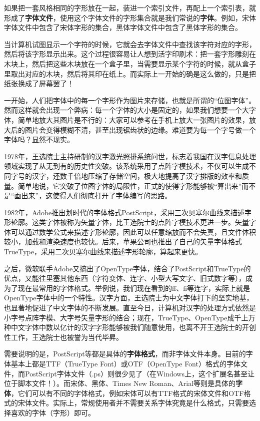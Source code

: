 如果把一套风格相同的字形放在一起，装进一个索引文件，再配上一个索引表，就形成了\textbf{字体文件}，使用这个字体文件的字形集合就是我们常说的\textbf{字体}。例如，宋体字体文件中包含了宋体字形的集合，黑体字体文件中包含了黑体字形的集合。

当计算机试图显示一个字符的时候，它就会去字体文件中查找该字符对应的字形，然后将该字形显示出来。这个过程很容易让人想到活字印刷术：把一套字形雕刻在木块上，然后把这些木块放在一个盒子里，当需要显示某个字符的时候，就从盒子里取出对应的木块，然后将其印在纸上。而实际上一开始的确是这么做的，只是把纸张换成了屏幕罢了！

一开始，人们把字体中的每一个字形作为图片来存储，也就是所谓的“位图字体”。然而这样就会出现一个弊病：每一个字体的大小是固定的，如果我们想要一个大字体，简单地放大其图片是不行的：大家可以参考在手机上放大一张图片的效果，放大后的图片会变得模糊不清，甚至出现锯齿状的边缘。难道要为每一个字号做一个字体吗？显然不现实。

1978年，王选院士主持研制的汉字激光照排系统问世，标志着我国在汉字信息处理领域实现了从无到有的历史性突破。该系统采用了点阵字模技术，不仅可以生成不同字号的汉字，还数千倍地压缩了存储空间，极大地提高了汉字排版的效率和质量。简单地说，它突破了位图字体的局限性，正式的使得字形能够被“算出来”而不是“画出来”，这使得人们彻底打开了字体编写的思路。

1982年，Adobe推出划时代的字体格式PostScript，采用三次贝塞尔曲线来描述字形轮廓。这类字体被称为矢量字体，比王选院士的点阵字模技术更进一步。矢量字体可以通过数学公式来描述字形轮廓，因此可以任意缩放而不会失真，且文件体积较小，加载和渲染速度也较快。后来，苹果公司也推出了自己的矢量字体格式TrueType，采用二次贝塞尔曲线来描述字形轮廓，算起来更快。

之后，微软联手Adobe又搞出了OpenType字体，结合了PostScript和TrueType的优点，又能往里塞其他东西（字符变体、连字、小型大写文字、旧式数字等），成为了现在最常用的字体格式。举例说，我们现在看到的ff、fi等连字，实际上就是OpenType字体中的一个特性。汉字方面，王选院士为中文字体打下的坚实地基，也显著地促进了中文字体的不断发展。直至今日，计算机对汉字的处理方式依然是小字号点阵字模、大字号矢量字形的结合；现在，TrueType、OpenType成千上万种中文字体中数以亿计的汉字字形能够被我们随意使用，也离不开王选院士的开创性工作，王选院士也被誉为当代毕昇。

需要说明的是，PostScript等都是具体的\textbf{字体格式}，而非字体文件本身。目前的字体基本上都是TTF（TrueType Font）或OTF（OpenType Font）格式的字体文件，而PostScript字体文件（.ps）则很少见了（在Windows上，这个扩展名甚至让位于脚本文件！）。而宋体、黑体、Times New Roman、Arial等则是具体的\textbf{字体}，它们可以有不同的字体格式，例如宋体可以有TTF格式的宋体文件和OTF格式的宋体文件。实际上，常规使用者并不需要关系字体究竟是什么格式，只需要选择喜欢的字体（字形）即可。

